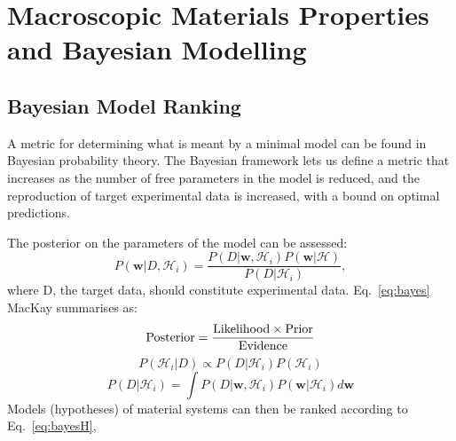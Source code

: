 \chapter{Macroscopic Materials Properties and Bayesian Modelling}
\label{chap:bayes}

\section{}

\section{Bayesian Model Ranking}
A metric for determining what is meant by a minimal model
can be found in Bayesian probability theory. The Bayesian framework 
lets us define a metric that increases as the number of free 
parameters in the model is reduced, and the reproduction of 
target experimental data is increased, with a bound on optimal predictions.

The posterior on the parameters of the model can be assessed:
%
\begin{equation}
\label{eq:bayes}
P(\mathbf{w}|D, \mathcal{H}_{i}) = 
\frac{P(D|\mathbf{w}, \mathcal{H}_{i})P(\mathbf{w}|\mathcal{H})}{P(D|\mathcal{H}_{i})},
\end{equation}
%
where D, the target data, should constitute experimental data. 
Eq.~\ref{eq:bayes} MacKay summarises as:
%
\begin{equation}
{\rm Posterior} = \frac{{\rm Likelihood} \times {\rm Prior}}{{\rm Evidence}}
\end{equation}
%
\begin{equation}
\label{eq:bayesH}
P(\mathcal{H}_{i}|D) \propto P(D|\mathcal{H}_{i})P(\mathcal{H}_{i})
\end{equation}
%
\begin{equation}
\label{eq:bayesH}
P(D|\mathcal{H}_{i}) = \int P(D|\mathbf{w}, \mathcal{H}_{i})P(\mathbf{w}|\mathcal{H}_{i})d\mathbf{w}
\end{equation}
%
Models (hypotheses) of material systems can then be ranked according to Eq.~\ref{eq:bayesH},  

